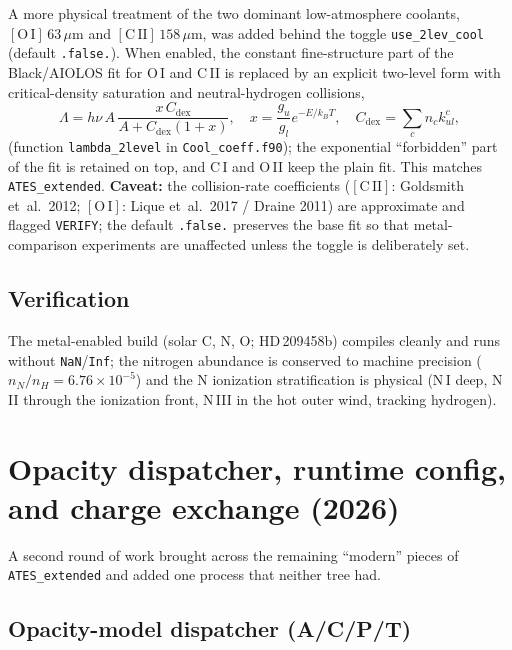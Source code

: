\documentclass[english,a4paper]{my_memo}
\begin{document}
A more physical treatment of the two dominant low-atmosphere coolants,
\([\mathrm{O\,I}]\,63\,\mu\)m and \([\mathrm{C\,II}]\,158\,\mu\)m, was
added behind the toggle \texttt{use\_2lev\_cool} (default
\texttt{.false.}).  When enabled, the constant fine-structure part of
the Black/AIOLOS fit for O\,I and C\,II is replaced by an explicit
two-level form with critical-density saturation and neutral-hydrogen
collisions,
\[
  \Lambda = h\nu\,A\,\frac{x\,C_{\mathrm{dex}}}
                          {A + C_{\mathrm{dex}}(1+x)},
  \quad x = \frac{g_u}{g_l}e^{-E/k_BT},
  \quad C_{\mathrm{dex}} = \sum_c n_c k_{ul}^{c},
\]
(function \texttt{lambda\_2level} in \texttt{Cool\_coeff.f90}); the
exponential ``forbidden'' part of the fit is retained on top, and C\,I
and O\,II keep the plain fit.  This matches \texttt{ATES\_extended}.
\textbf{Caveat:} the collision-rate coefficients
(\([\mathrm{C\,II}]\): Goldsmith et~al.~2012; \([\mathrm{O\,I}]\):
Lique et~al.~2017 / Draine 2011) are approximate and flagged
\texttt{VERIFY}; the default \texttt{.false.} preserves the base fit so
that metal-comparison experiments are unaffected unless the toggle is
deliberately set.

\subsection{Verification}

The metal-enabled build (solar C, N, O; HD\,209458b) compiles cleanly
and runs without \texttt{NaN}/\texttt{Inf}; the nitrogen abundance is
conserved to machine precision (\(n_N/n_H = 6.76\times10^{-5}\)) and the
N ionization stratification is physical (N\,I deep, N\,II through the
ionization front, N\,III in the hot outer wind, tracking hydrogen).

\section{Opacity dispatcher, runtime config, and charge exchange (2026)}
\label{sec:catchup}

A second round of work brought across the remaining ``modern'' pieces of
\texttt{ATES\_extended} and added one process that neither tree had.

\subsection{Opacity-model dispatcher (A/C/P/T)}
\end{document}
